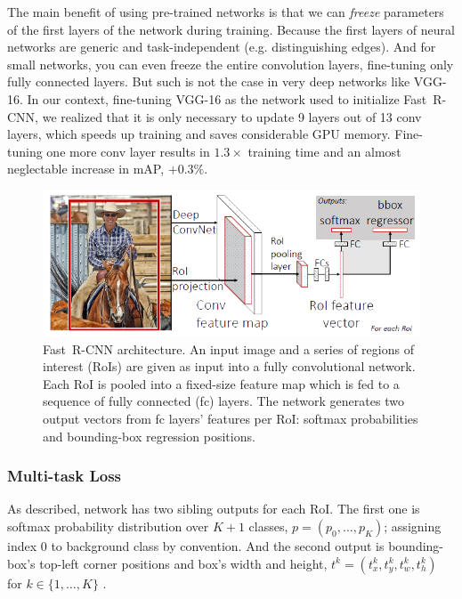 \documentclass[conference]{IEEEtran}
\newcommand{\fast}[0]{\mbox{Fast~R-CNN}}
\begin{document}
The main benefit of using pre-trained networks is that we can \textit{freeze} parameters of the first layers of the network during training. Because the first layers of neural networks are generic and task-independent \cite{a14} (e.g. distinguishing edges). And for small networks, you can even freeze the entire convolution layers, fine-tuning only fully connected layers. But such is not the case in very deep networks like VGG-16. In our context, fine-tuning VGG-16 as the network used to initialize \fast{}, we realized that it is only necessary to update 9 layers out of 13 conv layers, which speeds up training and saves considerable
GPU memory. Fine-tuning one more conv layer results in $1.3\times$ training time and an almost neglectable increase in mAP, $+0.3\%$.


\begin{figure}[t]
\centerline{\includegraphics[width=\linewidth]{FastRCNN.png}}
\caption{\fast{} architecture. An input image and a series of regions of interest (RoIs) are given as input into a fully convolutional network. Each RoI is pooled into a fixed-size feature map which is fed to a sequence of fully connected (fc) layers. The network generates two output vectors from fc layers' features per RoI: softmax probabilities and bounding-box regression positions.}
\label{FastRCNN}
\end{figure}
\subsubsection{Multi-task Loss}
As described, network has two sibling outputs for each RoI. The first one is softmax probability distribution over $K+1$ classes, $p = (p_0, \ldots, p_K)$; assigning index $0$ to background class by convention. And the second output is bounding-box's top-left corner positions and box's width and height, $t^k=(t^k_x, t^k_y, t^k_w, t^k_h)$ for $k\in \{1, \ldots, K\}$ \cite{a9}.
\end{document}
